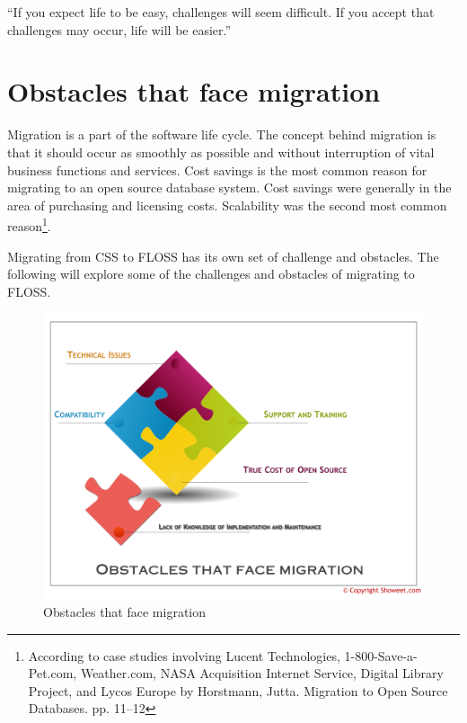  \newpage
 \begin{savequote}[108mm]
``If you expect life to be easy, challenges will seem difficult. If you accept that challenges may occur, life will be easier.''
\end{savequote}
 \chapter{Obstacles that face migration}
 \label{chap:Obstacles}
 \vspace{-2cm}
 Migration is a part of the software life cycle. The concept behind migration is that it should occur as smoothly as possible and without interruption of vital business functions and services.
 Cost savings is the most common reason for migrating to an open source database system. Cost savings were generally in the area of purchasing and licensing costs. Scalability was the second most common reason\footnote{According to case studies involving Lucent Technologies, 1-800-Save-a-Pet.com, Weather.com, NASA Acquisition Internet Service, Digital Library Project, and Lycos Europe by Horstmann, Jutta. Migration to Open Source Databases. pp. 11--12 }.
 
 Migrating from CSS to FLOSS has its own set of challenge and obstacles. The following will explore some of the challenges and obstacles of migrating to FLOSS. 
   \begin{figure}
    \centering
        \includegraphics[scale=0.6,angle=90]{img/obsticals.png}
      \caption{Obstacles that face migration}
      \label{fig:Obstacles}
    \end{figure}


